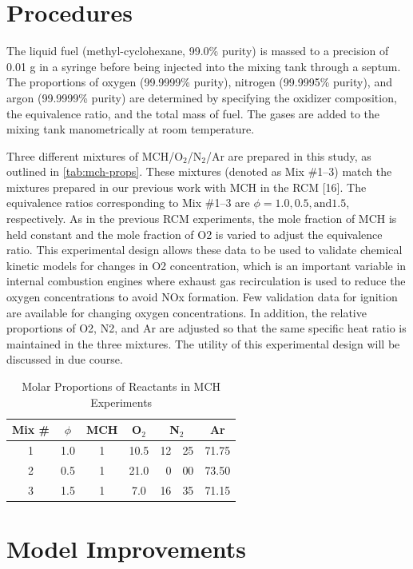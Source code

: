 \documentclass[12pt, letterpaper]{article}
\begin{document}
\section{Procedures}
The liquid fuel (methyl-cyclohexane, 99.0\% purity) is massed to a precision
of 0.01 g in a syringe before being injected into the mixing tank through a
septum. The proportions of oxygen (99.9999\% purity), nitrogen (99.9995\%
purity), and argon (99.9999\% purity) are determined by specifying the oxidizer
composition, the equivalence ratio, and the total mass of fuel. The gases are
added to the mixing tank manometrically at room temperature.

Three different mixtures of MCH/O$_2$/N$_2$/Ar are prepared in this study, as
outlined in \autoref{tab:mch-props}. These mixtures (denoted as Mix \#1–3) match the mixtures
prepared in our previous work with MCH in the RCM [16]. The equivalence ratios
corresponding to Mix \#1–3 are $\phi=1.0, 0.5, \mathrm{and} 1.5$, respectively.
As in the previous RCM experiments, the mole fraction of MCH is held constant
and the mole fraction of O2 is varied to adjust the equivalence ratio. This
experimental design allows these data to be used to validate chemical kinetic
models for changes in O2 concentration, which is an important variable in
internal combustion engines where exhaust gas recirculation is used to reduce
the oxygen concentrations to avoid NOx formation. Few validation data for
ignition are available for changing oxygen concentrations. In addition, the
relative proportions of O2, N2, and Ar are adjusted so that the same specific
heat ratio is maintained in the three mixtures. The utility of this
experimental design will be discussed in due course.

\begin{table}
    \centering
    \caption{Molar Proportions of Reactants in MCH Experiments}
    \label{tab:mch-props}
    \begin{tabular}{*{4}{c} r@{.} l c}
    \toprule
    Mix \# & $\phi$ & MCH & O$_2$ & \multicolumn{2}{c}{N$_2$} & Ar \\
    \midrule
    1 & 1.0 & 1 & 10.5 & 12 & 25 & 71.75 \\
    2 & 0.5 & 1 & 21.0 &  0 & 00 & 73.50 \\
    3 & 1.5 & 1 &  7.0 & 16 & 35 & 71.15 \\
    \bottomrule
    \end{tabular}
\end{table}

\section{Model Improvements}
\label{sec:model-improvements}
\end{document}

